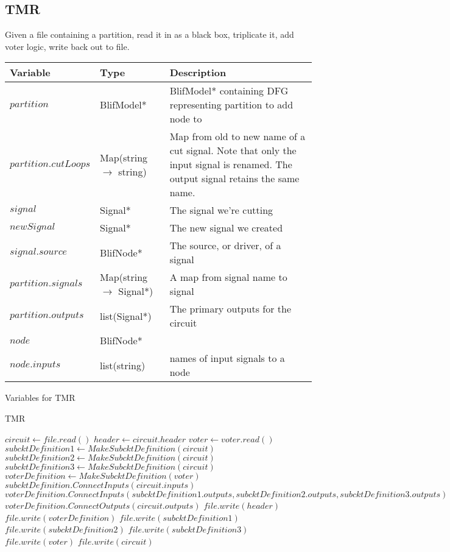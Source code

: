 \documentclass[12pt,final,oneside]{article} %
\begin{document}
\newpage
\subsection{TMR}
Given a file containing a partition, read it in as a black box, triplicate it, add voter logic, write back out to file.


\begin{algorithm}
    \begin{center}
        \begin{tabularx}{\linewidth}{llX}
        \toprule
        Variable & Type & Description\\
        \midrule
        $partition$ & BlifModel* & BlifModel* containing DFG representing partition to add node to\\
        $partition.cutLoops$ & Map(string $\to$ string) & Map from old to new name of a cut signal. Note that only the input signal is renamed. The output signal retains the same name.\\
        $signal$ & Signal* & The signal we're cutting\\
        $newSignal$ & Signal* & The new signal we created\\
        $signal.source$ & BlifNode* & The source, or driver, of a signal\\
        $partition.signals$ & Map(string $\to$ Signal*) & A map from signal name to signal\\
        $partition.outputs$ & list(Signal*) & The primary outputs for the circuit\\
        $node$ & BlifNode* & \\
        $node.inputs$ & list(string) & names of input signals to a node\\
        \bottomrule
        \end{tabularx}
        \caption{Variables for TMR}
        \label{varTMR}
    \end{center}
   \caption{TMR}\label{TMR}
   \begin{algorithmic}[1]
         \State $circuit \gets file.read()$
         \State $header \gets circuit.header$
         \State $voter \gets voter.read()$
         \State $subcktDefinition1 \gets MakeSubcktDefinition(circuit)$
         \State $subcktDefinition2 \gets MakeSubcktDefinition(circuit)$
         \State $subcktDefinition3 \gets MakeSubcktDefinition(circuit)$
         \State $voterDefinition \gets MakeSubcktDefinition(voter)$
         \State $subcktDefinition.ConnectInputs(circuit.inputs)$
         \State $voterDefinition.ConnectInputs(subcktDefinition1.outputs, subcktDefinition2.outputs, subcktDefinition3.outputs)$
         \State $voterDefinition.ConnectOutputs(circuit.outputs)$
         \State $file.write(header)$
         \State $file.write(voterDefinition)$
         \State $file.write(subcktDefinition1)$
         \State $file.write(subcktDefinition2)$
         \State $file.write(subcktDefinition3)$
         \State $file.write(voter)$
         \State $file.write(circuit)$
      \EndProcedure
   \end{algorithmic}
\end{algorithm}
\end{document}
